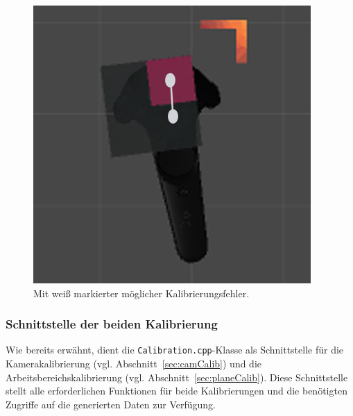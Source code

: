 \begin{figure}
	\centering
	\includegraphics[scale=0.6]{Bilder/Neue Screenshots/Kalibrierungsfehler_OR-KLEIN.jpg}
	\caption{Mit weiß markierter möglicher Kalibrierungsfehler.}
	\label{fig:markierterFehler}
\end{figure}



\subsubsection{Schnittstelle der beiden Kalibrierung} \label{sec:CalibSteuerung}
Wie bereits erwähnt, dient die \texttt{Calibration.cpp}-Klasse als Schnittstelle für die Kamerakalibrierung (vgl. Abschnitt~\ref{sec:camCalib}) und die Arbeitsbereichskalibrierung (vgl. Abschnitt~\ref{sec:planeCalib}). Diese Schnittstelle stellt alle erforderlichen Funktionen für beide Kalibrierungen und die benötigten Zugriffe auf die generierten Daten zur Verfügung. 


